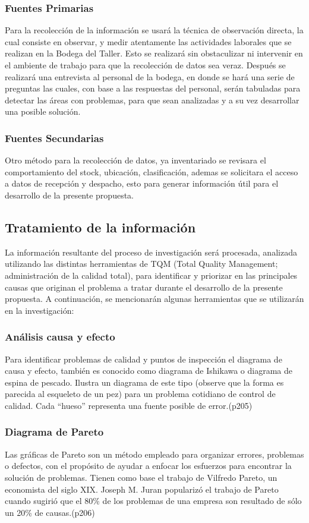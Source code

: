 \documentclass[a4papper,11pt]{article}
\begin{document}
  \subsubsection{Fuentes Primarias}
    Para la recolección de la información se usará la técnica de observación directa, la cual consiste en observar, y medir atentamente las actividades laborales que se realizan en la Bodega del Taller. Esto se realizará sin obstaculizar ni intervenir en el ambiente de trabajo para que la recolección de datos sea veraz. Después se realizará una entrevista al personal de la bodega, en donde se hará una serie de preguntas las cuales, con base a las respuestas del personal, serán tabuladas para detectar las áreas con problemas, para que sean analizadas y a su vez desarrollar una posible solución.
  \subsubsection{Fuentes Secundarias}
    Otro método para la recolección de datos, ya inventariado se revisara el comportamiento del stock, ubicación, clasificación, ademas se solicitara el acceso a datos de recepción y despacho, esto para generar información útil para el desarrollo de la presente propuesta.
  \subsection{Tratamiento de la información}
    La información resultante del proceso de investigación será procesada, analizada utilizando las distintas herramientas de  TQM (Total Quality Management; administración de la calidad total), para identificar y priorizar en las principales causas que originan el problema a tratar durante el desarrollo de la presente propuesta. A continuación, se mencionarán algunas herramientas que se utilizarán en la investigación:
  
  \subsubsection{Análisis causa y efecto}
    Para identificar problemas de calidad y puntos de inspección el diagrama de causa y efecto, también es conocido como diagrama de Ishikawa o diagrama de espina de pescado. Ilustra un diagrama de este tipo (observe que la forma es parecida al esqueleto de un pez) para un problema cotidiano de control de calidad. Cada “hueso” representa una fuente posible de error.(p205)
  \subsubsection{Diagrama de Pareto}
    Las gráficas de Pareto son un método empleado para organizar errores, problemas o defectos, con el propósito de ayudar a enfocar los esfuerzos para encontrar la solución de problemas. Tienen como base el trabajo de Vilfredo Pareto, un economista del siglo XIX. Joseph M. Juran popularizó el trabajo de Pareto cuando sugirió que el 80\% de los problemas de una empresa son resultado de sólo un 20\% de causas.(p206)
\end{document}
